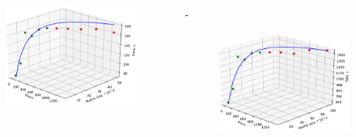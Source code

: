 \documentclass[unicode, t, 11pt]{beamer}%
\newlength{\mylen}
\begin{document}
			\begin{frame}
				\footnotesize
				\frametitle{\insertsection}
		 		\framesubtitle{\insertsubsection}
				\begin{columns}[T]
					\setlength{\mylen}{0.5\textwidth}
					\begin{column}{\mylen}
						\begin{figure}
							\captionsetup{font=tiny, labelfont=tiny}
							\centering
							\includegraphics[width=.7\textwidth]{./images/dns_k2}
						\end{figure}
					\end{column}
					\begin{column}{\dimexpr\textwidth-\mylen}
						\begin{figure}
							\captionsetup{font=tiny, labelfont=tiny}
							\centering
							\includegraphics[width=.7\textwidth]{./images/dns_k1}
						\end{figure}
					\end{column}
				\end{columns}

\end{frame}
\end{document}
